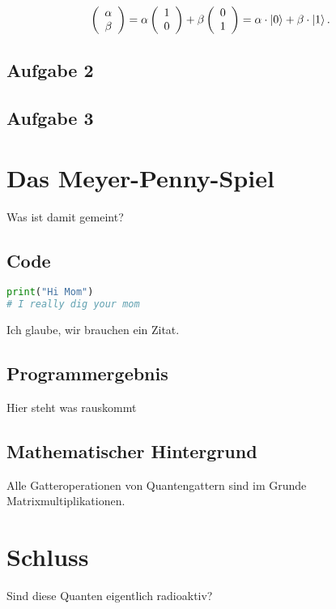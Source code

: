 \begin{align}
    \left(\begin{array}{c}
        \alpha\\
        \beta
    \end{array}\right) 
    =
    \alpha \left(\begin{array}{c}
        1\\
        0   
    \end{array}\right) 
    +
    \beta \left(\begin{array}{c}
        0\\
        1   
    \end{array}\right) 
    =
    \alpha \cdot \ket{0}+\beta \cdot \ket{1}.
\end{align}



\section{Aufgabe 2}
\section{Aufgabe 3}
\chapter{Das Meyer-Penny-Spiel}
Was ist damit gemeint?

\section{Code}
\begin{lstlisting}[caption=Python-Code \texttt{./mybestpython.py}, label=pythoncodebeispiel, language=python]
print("Hi Mom") 
# I really dig your mom
\end{lstlisting}
Ich glaube, wir brauchen ein Zitat\cite{NielsenChuang}.

\section{Programmergebnis}
Hier steht was rauskommt
\section{Mathematischer Hintergrund}
Alle Gatteroperationen von Quantengattern sind im Grunde Matrixmultiplikationen.

\chapter{Schluss}
Sind diese Quanten eigentlich radioaktiv?
